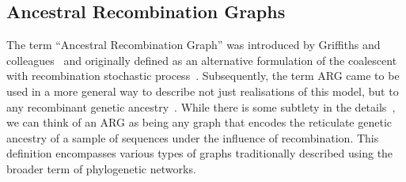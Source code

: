 \documentclass{article}
\begin{document}


\subsection{Ancestral Recombination Graphs}
\label{sec:args}
The term ``Ancestral Recombination Graph'' was introduced by
Griffiths and colleagues~\citep{Griffiths1991-two,Griffiths1998-ancestral}
and originally defined as an alternative formulation of the coalescent
with recombination stochastic process~\citep{Hudson1983-properties}.
Subsequently, the term ARG came to be used in a more general way to
describe not just realisations of this model, but to any
recombinant genetic ancestry~\citep{Minichiello2006-mapping}.
While there is some subtlety in the details~\citep{Wong2023-efficient},
we can think of an ARG as being any graph that encodes the
reticulate genetic ancestry of a sample of sequences under
the influence of recombination. This definition encompasses various types of graphs traditionally described using the broader term of phylogenetic networks.
\end{document}
